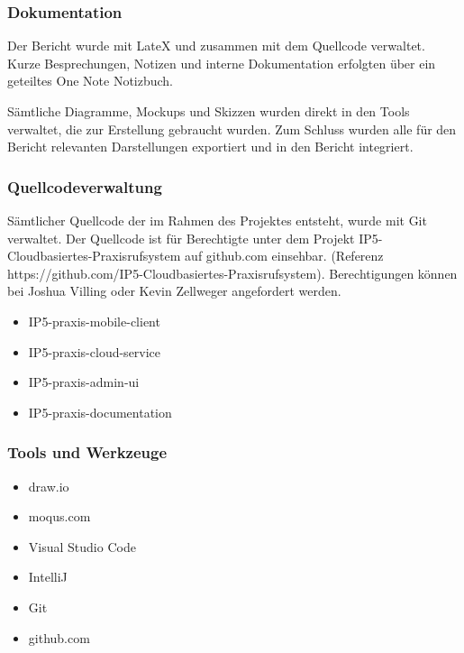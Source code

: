     \subsubsection*{Dokumentation}

        Der Bericht wurde mit LateX und zusammen mit dem Quellcode verwaltet. Kurze Besprechungen, Notizen und interne Dokumentation erfolgten über ein geteiltes One Note Notizbuch. 

        Sämtliche Diagramme, Mockups und Skizzen wurden direkt in den Tools verwaltet, die zur Erstellung gebraucht wurden. Zum Schluss wurden alle für den Bericht relevanten Darstellungen exportiert und in den Bericht integriert.

    \subsubsection*{Quellcodeverwaltung}

        Sämtlicher Quellcode der im Rahmen des Projektes entsteht, wurde mit Git verwaltet. Der Quellcode ist für Berechtigte unter dem Projekt IP5-Cloudbasiertes-Praxisrufsystem auf github.com einsehbar. 
        (Referenz https://github.com/IP5-Cloudbasiertes-Praxisrufsystem). Berechtigungen können bei Joshua Villing oder Kevin Zellweger angefordert werden. 

        \begin{itemize}
            \item IP5-praxis-mobile-client
            \item IP5-praxis-cloud-service
            \item IP5-praxis-admin-ui
            \item IP5-praxis-documentation
        \end{itemize}

    \subsubsection*{Tools und Werkzeuge}

        \begin{itemize}
            \item draw.io
            \item moqus.com
            \item Visual Studio Code
            \item IntelliJ
            \item Git
            \item github.com 
        \end{itemize}
